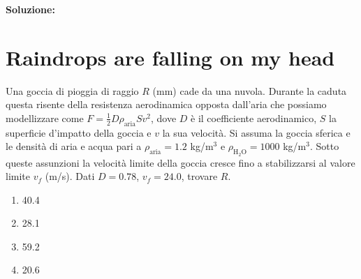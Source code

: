 \noindent \textbf{Soluzione:}


\section{Raindrops are falling on my head}
Una goccia di pioggia di raggio $R$ (mm)
cade da una nuvola. Durante la caduta
questa risente della resistenza aerodinamica
opposta dall'aria che possiamo modellizzare
come $F = \frac12 D \rho_\text{aria} S v^2$,
dove $D$ è il coefficiente aerodinamico,
$S$ la superficie d'impatto della goccia e
$v$ la sua velocità. Si assuma la goccia
sferica e le densità di aria e acqua pari a
$\rho_\text{aria} = 1.2$ kg/m$^3$ e
$\rho_\text{H$_2$O} = 1000$ kg/m$^3$. Sotto
queste assunzioni la velocità limite della
goccia cresce fino a stabilizzarsi al
valore limite $v_f$ (m/s). Dati $D = 0.78$,
$v_f = 24.0$, trovare $R$.

\begin{enumerate}
    \item 40.4
    \item 28.1
    \item 59.2
    \item 20.6
\end{enumerate}